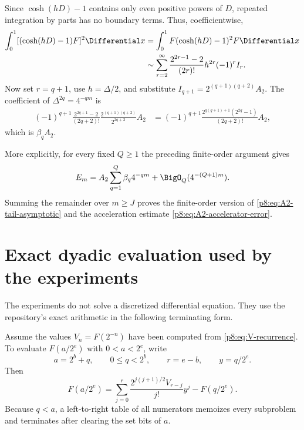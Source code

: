 \documentclass[11pt]{article}
\theoremstyle{definition}
\theoremstyle{remark}
\begin{document}
Since $\cosh(hD)-1$ contains only even positive powers of $D$, repeated
integration by parts has no boundary terms.  Thus, coefficientwise,
\begin{align}
 \int_0^1[(\cosh(hD)-1)F]^2\Differential x
 &=\int_0^1F(\cosh(hD)-1)^2F\Differential x                       \label{p8:eq:operator-square}\\
 &\sim\sum_{r=2}^\infty
 \frac{2^{2r-1}-2}{(2r)!}h^{2r}(-1)^rI_r.               \label{p8:eq:operator-coeff}
\end{align}
Now set $r=q+1$, use $h=\Delta/2$, and substitute
$I_{q+1}=2^{(q+1)(q+2)}A_2$.  The coefficient of
$\Delta^{2q}=4^{-qm}$ is
\begin{align}
 (-1)^{q+1}
 \frac{2^{2q+1}-2}{(2q+2)!}
 \frac{2^{(q+1)(q+2)}}{2^{2q+2}}A_2
 &=(-1)^{q+1}
 \frac{2^{q(q+1)+1}(2^{2q}-1)}{(2q+2)!}A_2,            \label{p8:eq:beta-derivation}
\end{align}
which is $\beta_qA_2$.

More explicitly, for every fixed $Q\ge1$ the preceding finite-order
argument gives
\begin{equation}
 E_m=A_2\sum_{q=1}^{Q}\beta_q4^{-qm}
 +\BigO_Q(4^{-(Q+1)m}).                                  \label{p8:eq:Em-finite-asymptotic}
\end{equation}
Summing the remainder over $m\ge J$ proves the finite-order version of
\eqref{p8:eq:A2-tail-asymptotic} and the acceleration estimate
\eqref{p8:eq:A2-accelerator-error}.

\section{Exact dyadic evaluation used by the experiments}
\label{p8:app:dyadic-algorithm}

The experiments do not solve a discretized differential equation.  They use
the repository's exact arithmetic in the following terminating form.

\begin{algorithm}
\label{p8:alg:highest-bit}
Assume the values $V_n=F(2^{-n})$ have been computed from
\eqref{p8:eq:V-recurrence}.  To evaluate $F(a/2^e)$ with
$0<a<2^e$, write
\begin{equation}
 a=2^b+q,
 \qquad 0\le q<2^b,
 \qquad r=e-b,
 \qquad y=q/2^e.                                        \label{p8:eq:bit-decomposition}
\end{equation}
Then
\begin{equation}
 \boxed{\displaystyle
 F(a/2^e)=
 \sum_{j=0}^{r}
 \frac{2^{j(j+1)/2}V_{r-j}}{j!}y^j-F(q/2^e).}           \label{p8:eq:highest-bit-evaluator}
\end{equation}
Because $q<a$, a left-to-right table of all numerators memoizes every
subproblem and terminates after clearing the set bits of $a$.
\end{algorithm}
\end{document}
